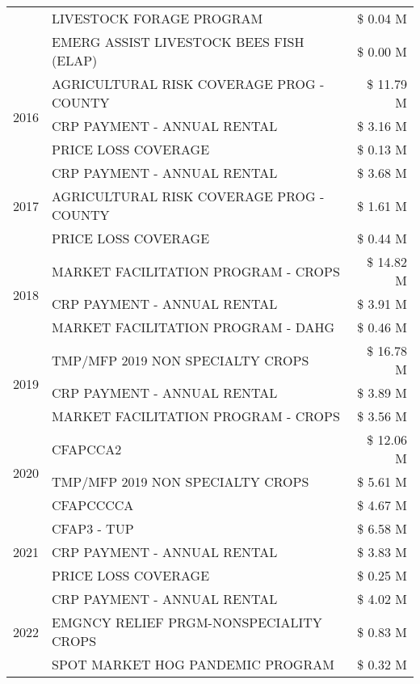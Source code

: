 \begin{tabular}{llr}
 & LIVESTOCK FORAGE PROGRAM & \$ 0.04 M \\
 & EMERG ASSIST LIVESTOCK BEES FISH (ELAP) & \$ 0.00 M \\
\cline{1-3}
\multirow[t]{3}{*}{2016} & AGRICULTURAL RISK COVERAGE PROG - COUNTY & \$ 11.79 M \\
 & CRP PAYMENT - ANNUAL RENTAL & \$ 3.16 M \\
 & PRICE LOSS COVERAGE & \$ 0.13 M \\
\cline{1-3}
\multirow[t]{3}{*}{2017} & CRP PAYMENT - ANNUAL RENTAL & \$ 3.68 M \\
 & AGRICULTURAL RISK COVERAGE PROG - COUNTY & \$ 1.61 M \\
 & PRICE LOSS COVERAGE & \$ 0.44 M \\
\cline{1-3}
\multirow[t]{3}{*}{2018} & MARKET FACILITATION PROGRAM - CROPS & \$ 14.82 M \\
 & CRP PAYMENT - ANNUAL RENTAL & \$ 3.91 M \\
 & MARKET FACILITATION PROGRAM - DAHG & \$ 0.46 M \\
\cline{1-3}
\multirow[t]{3}{*}{2019} & TMP/MFP 2019 NON SPECIALTY CROPS & \$ 16.78 M \\
 & CRP PAYMENT - ANNUAL RENTAL & \$ 3.89 M \\
 & MARKET FACILITATION PROGRAM - CROPS & \$ 3.56 M \\
\cline{1-3}
\multirow[t]{3}{*}{2020} & CFAPCCA2 & \$ 12.06 M \\
 & TMP/MFP 2019 NON SPECIALTY CROPS & \$ 5.61 M \\
 & CFAPCCCCA & \$ 4.67 M \\
\cline{1-3}
\multirow[t]{3}{*}{2021} & CFAP3 - TUP & \$ 6.58 M \\
 & CRP PAYMENT - ANNUAL RENTAL & \$ 3.83 M \\
 & PRICE LOSS COVERAGE & \$ 0.25 M \\
\cline{1-3}
\multirow[t]{3}{*}{2022} & CRP PAYMENT - ANNUAL RENTAL & \$ 4.02 M \\
 & EMGNCY RELIEF PRGM-NONSPECIALITY CROPS & \$ 0.83 M \\
 & SPOT MARKET HOG PANDEMIC PROGRAM & \$ 0.32 M \\
\cline{1-3}
\bottomrule
\end{tabular}
